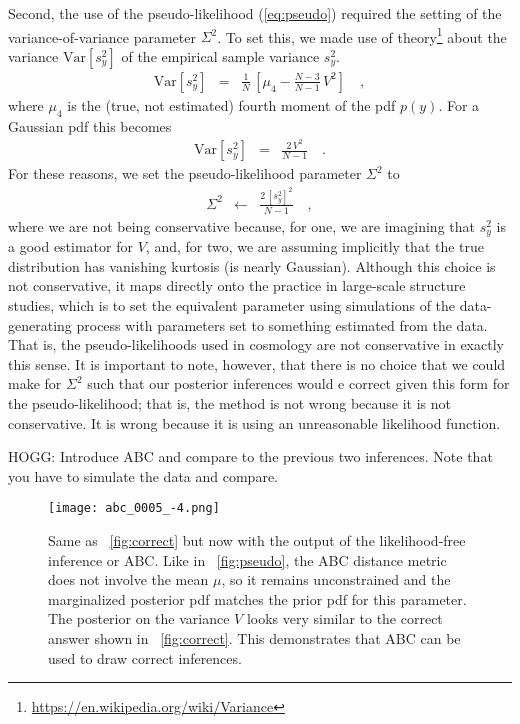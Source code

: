 \documentclass[12pt, letterpaper, preprint]{aastex}
\newcommand{\Var}{\mathrm{Var}}
\begin{document}
Second, the use of the pseudo-likelihood (\ref{eq:pseudo}) required
the setting of the variance-of-variance parameter $\Sigma^2$.
To set this, we made use of theory\footnote{\url{https://en.wikipedia.org/wiki/Variance}}
about the variance $\Var[s^2_y]$ of
the empirical sample variance $s^2_y$.
\begin{eqnarray}
\Var[s^2_y] &=& \frac{1}{N}\,\left[\mu_4 - \frac{N-3}{N-1}\,V^2\right]
\quad ,
\end{eqnarray}
where $\mu_4$ is the (true, not estimated) fourth moment of the pdf $p(y)$.
For a Gaussian pdf this becomes
\begin{eqnarray}
\Var[s^2_y] &=& \frac{2\,V^2}{N-1}
\quad .
\end{eqnarray}
For these reasons, we set the pseudo-likelihood parameter $\Sigma^2$ to
\begin{eqnarray}
\Sigma^2 &\leftarrow& \frac{2\,[s^2_y]^2}{N-1}
\quad ,
\end{eqnarray}
where we are not being conservative because, for one, we are imagining
that $s^2_y$ is a good estimator for $V$, and, for two, we are
assuming implicitly that the true distribution has vanishing kurtosis
(is nearly Gaussian).
Although this choice is not conservative, it maps directly onto the
practice in large-scale structure studies, which is to set the
equivalent parameter using simulations of the data-generating process
with parameters set to something estimated from the data.
That is, the pseudo-likelihoods used in cosmology are not conservative
in exactly this sense.
It is important to note, however, that there is no choice that we
could make for $\Sigma^2$ such that our posterior inferences would e
correct given this form for the pseudo-likelihood; that is, the method
is not wrong because it is not conservative. It is wrong because it
is using an unreasonable likelihood function.

HOGG: Introduce ABC and compare to the previous two inferences.
Note that you have to simulate the data and compare.

\begin{figure}
\texttt{[image: abc\_0005\_-4.png]}
\caption{Same as \figurename~\ref{fig:correct} but now with the output
  of the likelihood-free inference or ABC. Like in
  \figurename~\ref{fig:pseudo}, the ABC distance metric does not
  involve the mean $\mu$, so it remains unconstrained and the
  marginalized posterior pdf matches the prior pdf for this
  parameter. The posterior on the variance $V$ looks very similar to
  the correct answer shown in \figurename~\ref{fig:correct}. This
  demonstrates that ABC can be used to draw correct
  inferences.\label{fig:abc}}
\end{figure}
\end{document}
